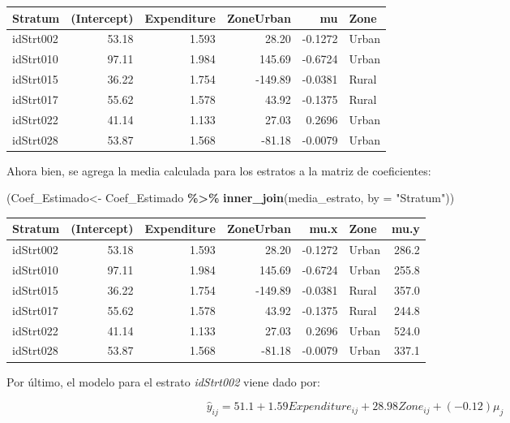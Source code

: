 \documentclass[
  12pt,
]{book}
\newenvironment{Shaded}{\begin{snugshade}}{\end{snugshade}}
\newcommand{\AttributeTok}[1]{\textcolor[rgb]{0.13,0.29,0.53}{#1}}
\newcommand{\FunctionTok}[1]{\textcolor[rgb]{0.13,0.29,0.53}{\textbf{#1}}}
\newcommand{\NormalTok}[1]{#1}
\newcommand{\OtherTok}[1]{\textcolor[rgb]{0.56,0.35,0.01}{#1}}
\newcommand{\SpecialCharTok}[1]{\textcolor[rgb]{0.81,0.36,0.00}{\textbf{#1}}}
\newcommand{\StringTok}[1]{\textcolor[rgb]{0.31,0.60,0.02}{#1}}
\begin{document}
\begin{tabular}{l|r|r|r|r|l}
\hline
Stratum & (Intercept) & Expenditure & ZoneUrban & mu & Zone\\
\hline
idStrt002 & 53.18 & 1.593 & 28.20 & -0.1272 & Urban\\
\hline
idStrt010 & 97.11 & 1.984 & 145.69 & -0.6724 & Urban\\
\hline
idStrt015 & 36.22 & 1.754 & -149.89 & -0.0381 & Rural\\
\hline
idStrt017 & 55.62 & 1.578 & 43.92 & -0.1375 & Rural\\
\hline
idStrt022 & 41.14 & 1.133 & 27.03 & 0.2696 & Urban\\
\hline
idStrt028 & 53.87 & 1.568 & -81.18 & -0.0079 & Urban\\
\hline
\end{tabular}

Ahora bien, se agrega la media calculada para los estratos a la matriz de coeficientes:

\begin{Shaded}
\begin{Highlighting}[]
\NormalTok{(Coef\_Estimado}\OtherTok{\textless{}{-}}\NormalTok{ Coef\_Estimado }\SpecialCharTok{\%\textgreater{}\%}  \FunctionTok{inner\_join}\NormalTok{(media\_estrato, }\AttributeTok{by =} \StringTok{"Stratum"}\NormalTok{))}
\end{Highlighting}
\end{Shaded}

\begin{tabular}{l|r|r|r|r|l|r}
\hline
Stratum & (Intercept) & Expenditure & ZoneUrban & mu.x & Zone & mu.y\\
\hline
idStrt002 & 53.18 & 1.593 & 28.20 & -0.1272 & Urban & 286.2\\
\hline
idStrt010 & 97.11 & 1.984 & 145.69 & -0.6724 & Urban & 255.8\\
\hline
idStrt015 & 36.22 & 1.754 & -149.89 & -0.0381 & Rural & 357.0\\
\hline
idStrt017 & 55.62 & 1.578 & 43.92 & -0.1375 & Rural & 244.8\\
\hline
idStrt022 & 41.14 & 1.133 & 27.03 & 0.2696 & Urban & 524.0\\
\hline
idStrt028 & 53.87 & 1.568 & -81.18 & -0.0079 & Urban & 337.1\\
\hline
\end{tabular}

Por último, el modelo para el estrato \emph{idStrt002} viene dado por:

\[
\hat{y}_{ij}=51.1+1.59Expenditure_{ij}+28.98Zone_{ij}+\left(-0.12\right)\mu_{j}
\]
\end{document}
